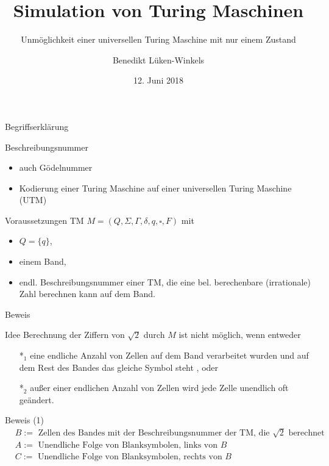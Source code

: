 \documentclass[aspectratio=169]{beamer}
\title{Simulation von Turing Maschinen}
\subtitle{Unm{\"o}glichkeit einer universellen Turing Maschine mit nur einem Zustand}
\date{12. Juni 2018}
\author{Benedikt L{\"u}ken-Winkels}
\institute{Universit{\"a}t Trier}
\begin{document}
\maketitle

\nocite{*}

\begin{frame}{Begriffserkl{\"a}rung}
\begin{block}{Beschreibungsnummer} \pause
\begin{itemize}
\item auch Gödelnummer 
\item Kodierung einer Turing Maschine auf einer universellen Turing Maschine (UTM)
\end{itemize}
\end{block}
\end{frame}


\begin{frame}
\begin{block}{Voraussetzungen}
TM $M = ( Q, \Sigma, \Gamma, \delta, q, \square, F)$ mit \pause
\begin{itemize}
\item $Q = \{q\}$,
\item einem Band, \pause
\item endl. Beschreibungsnummer einer TM, die eine bel. berechenbare (irrationale) Zahl berechnen kann auf dem Band.
\end{itemize}
\end{block}
\end{frame}

\begin{frame}{Beweis}
\begin{block}{Idee}
Berechnung der Ziffern von $\sqrt{2}$ durch $M$ ist nicht möglich, wenn entweder \pause
\begin{itemize}
\item[*$_{1}$] eine endliche Anzahl von Zellen auf dem Band verarbeitet wurden und auf dem Rest des Bandes das gleiche Symbol steht , oder \pause
\item[*$_{2}$] außer einer endlichen Anzahl von Zellen wird jede Zelle unendlich oft geändert.
\end{itemize}
\end{block}
\end{frame}

\begin{frame}{Beweis (1)}
\begin{align*}
& B:= \text{ Zellen des Bandes mit der Beschreibungsnummer der TM, die } \sqrt{2} \text{ berechnet} \\
& A:= \text{ Unendliche Folge von Blanksymbolen, links von } B \\
& C:= \text{ Unendliche Folge von Blanksymbolen, rechts von } B \\
\end{align*}
\end{frame}
\end{document}
